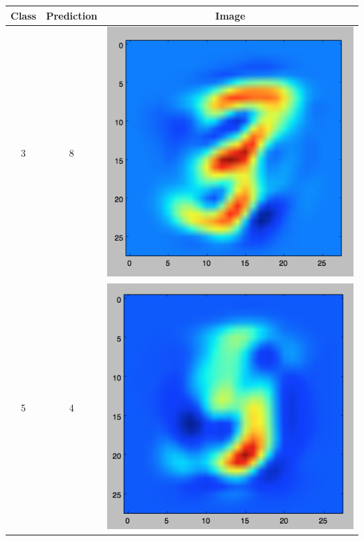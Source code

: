 \documentclass[11pt]{article}
\begin{document}
\begin{table}[!th]
\centering
\begin{tabular}{|c|c|c|}
\hline
Class & Prediction & Image \\
\hline
3 & 8 & \includegraphics[scale=.15]{images/knn1_3_8.png} \\
\hline
5 & 4 & \includegraphics[scale=.15]{images/knn1_5_4.png} \\

\end{tabular}
\end{table}
\end{document}
